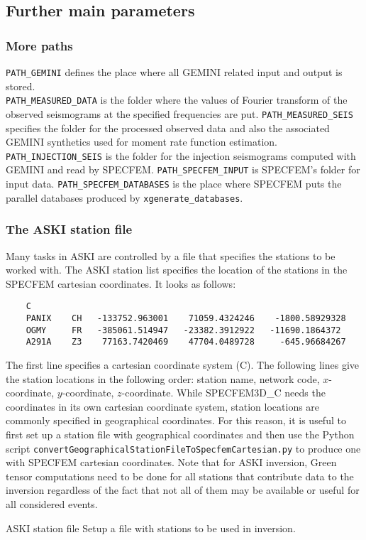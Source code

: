 \subsection{Further main parameters}
%
\subsubsection{More paths}
%
\verb+PATH_GEMINI+ defines the place where all GEMINI related input and output is stored.\\ \verb+PATH_MEASURED_DATA+ is the folder where the values of Fourier transform of the observed seismograms at the specified frequencies are put. \verb+PATH_MEASURED_SEIS+ specifies the folder for the processed observed data and also the associated GEMINI synthetics used for moment rate function estimation. \verb+PATH_INJECTION_SEIS+ is the folder for the injection seismograms computed with GEMINI and read by SPECFEM. \verb+PATH_SPECFEM_INPUT+ is SPECFEM's folder for input data. \verb+PATH_SPECFEM_DATABASES+ is the place where SPECFEM puts the parallel databases produced by \verb+xgenerate_databases+.
%
\subsubsection{The ASKI station file}
\label{sec:station_list}
%
Many tasks in ASKI are controlled by a file that specifies the stations to be worked with. The ASKI station list specifies the location of the stations in the SPECFEM cartesian coordinates. It looks as follows:
\begin{verbatim}
	C
	PANIX    CH   -133752.963001    71059.4324246    -1800.58929328
	OGMY     FR   -385061.514947   -23382.3912922   -11690.1864372
	A291A    Z3    77163.7420469    47704.0489728     -645.96684267
\end{verbatim}
The first line specifies a cartesian coordinate system (C). The following lines give the station locations in the following order: station name, network code, $x$-coordinate, $y$-coordinate, $z$-coordinate.
 While SPECFEM3D\_C needs the coordinates in its own cartesian coordinate system, station locations are commonly specified in geographical coordinates. For this reason, it is useful to first set up a station file with geographical coordinates and then use the Python script \verb+convertGeographicalStationFileToSpecfemCartesian.py+ to produce one with SPECFEM cartesian coordinates. Note that for ASKI inversion, Green tensor computations need to be done for all stations that contribute data to the inversion regardless of the fact that not all of them may be available or useful for all considered events.
%
 \begin{actionbox}[label={action:station-file},float=h!]{ASKI station file}
    Setup a file with stations to be used in inversion.
 \end{actionbox}
%
